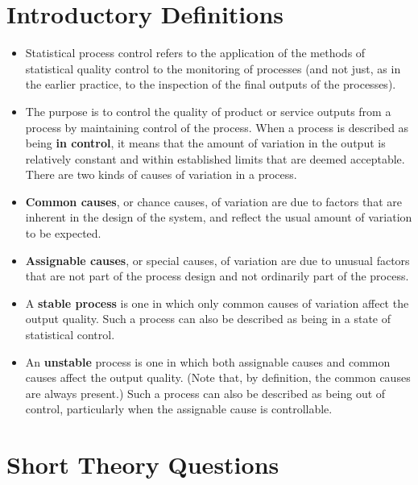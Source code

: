 \documentclass[12pt]{article}
\begin{document}
\section*{Introductory Definitions}
\begin{itemize}
\item Statistical process control refers to the application of the methods of statistical quality control to the
monitoring of processes (and not just, as in the earlier practice, to the inspection of the final outputs of the
processes).

\item The purpose is to control the quality of product or service outputs from a process by maintaining
control of the process. When a process is described as being \textbf{in control}, it means that the amount of variation
in the output is relatively constant and within established limits that are deemed acceptable. There are two kinds
of causes of variation in a process.

\item \textbf{Common causes}, or chance causes, of variation are due to factors that are
inherent in the design of the system, and reflect the usual amount of variation to be expected.
\item \textbf{Assignable causes},
or special causes, of variation are due to unusual factors that are not part of the process design and not ordinarily
part of the process.

\item A \textbf{stable process} is one in which only common causes of variation affect the output quality. Such a process
can also be described as being in a state of statistical control.

\item An \textbf{unstable} process is one in which both
assignable causes and common causes affect the output quality. (Note that, by definition, the common causes
are always present.) Such a process can also be described as being out of control, particularly when the
assignable cause is controllable.
\end{itemize}

\newpage

\section*{Short Theory Questions}
\end{document}
